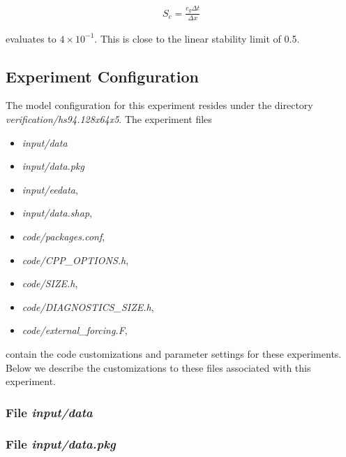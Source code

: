 \begin{eqnarray}
\label{EQ:eg-hs-gfl_stability}
S_{c} = \frac{c_{g} \Delta t}{ \Delta x}
\end{eqnarray}

\noindent evaluates to $4 \times 10^{-1}$. This is close to the linear
stability limit of 0.5.
  
\subsection{Experiment Configuration}
\label{www:tutorials}
\label{SEC:eg-hs_examp_exp_config}

The model configuration for this experiment resides under the 
directory {\it verification/hs94.128x64x5}.  The experiment files 
\begin{itemize}
\item {\it input/data}
\item {\it input/data.pkg}
\item {\it input/eedata},
\item {\it input/data.shap},
\item {\it code/packages.conf},
\item {\it code/CPP\_OPTIONS.h},
\item {\it code/SIZE.h},
\item {\it code/DIAGNOSTICS\_SIZE.h},
\item {\it code/external\_forcing.F},
\end{itemize}
contain the code customizations and parameter settings for these
experiments. Below we describe the customizations
to these files associated with this experiment.

\subsubsection{File {\it input/data}}
\label{www:tutorials}



\begin{small}

\end{small}

\subsubsection{File {\it input/data.pkg}}
\label{www:tutorials}



